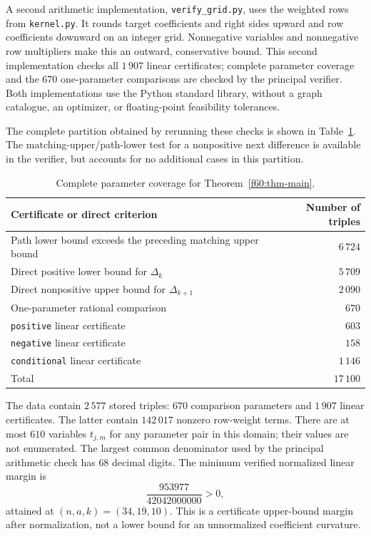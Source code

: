 A second arithmetic implementation, \texttt{verify\_grid.py}, uses
the weighted rows from \texttt{kernel.py}.  It rounds target coefficients
and right sides upward and row coefficients downward on an integer
grid.  Nonnegative variables and nonnegative row multipliers make this
an outward, conservative bound.  This second implementation checks all
$1\,907$ linear certificates; complete parameter coverage and the
$670$ one-parameter comparisons are checked by the principal verifier.
Both implementations use the Python standard library, without a graph
catalogue, an optimizer, or floating-point feasibility tolerances.

The complete partition obtained by rerunning these checks is shown in
Table~\ref{f60:tab-coverage}.  The matching-upper/path-lower test for a
nonpositive next difference is available in the verifier, but accounts
for no additional cases in this partition.

\begin{table}[htbp]
\centering
\begin{tabular}{lr}
\hline
Certificate or direct criterion & Number of triples\\
\hline
Path lower bound exceeds the preceding matching upper bound & $6\,724$\\
Direct positive lower bound for $\Delta_k$ & $5\,709$\\
Direct nonpositive upper bound for $\Delta_{k+1}$ & $2\,090$\\
One-parameter rational comparison & $670$\\
\texttt{positive} linear certificate & $603$\\
\texttt{negative} linear certificate & $158$\\
\texttt{conditional} linear certificate & $1\,146$\\
\hline
Total & $17\,100$\\
\hline
\end{tabular}
\caption{Complete parameter coverage for Theorem~\ref{f60:thm-main}.}
\label{f60:tab-coverage}
\end{table}

The data contain $2\,577$ stored triples: $670$ comparison parameters
and $1\,907$ linear certificates.  The latter contain $142\,017$
nonzero row-weight terms.  There are at most $610$ variables $t_{j,m}$
for any parameter pair in this domain; their values are not enumerated.
The largest common denominator used by the principal arithmetic check
has $68$ decimal digits.  The minimum verified normalized linear
margin is
\[
 \frac{953977}{42042000000}>0,
\]
attained at $(n,a,k)=(34,19,10)$.  This is a certificate upper-bound
margin after normalization, not a lower bound for an unnormalized
coefficient curvature.


